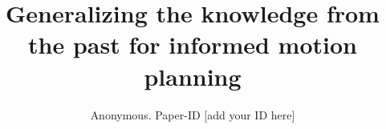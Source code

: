 \documentclass[conference]{IEEEtran}
\begin{document}
\title{Generalizing the knowledge from the past for informed motion planning}

\author{Anonymous. Paper-ID [add your ID here]}


\maketitle
\thispagestyle{empty}
\pagestyle{empty}


%


%



\IEEEpeerreviewmaketitle

  




\end{document}

